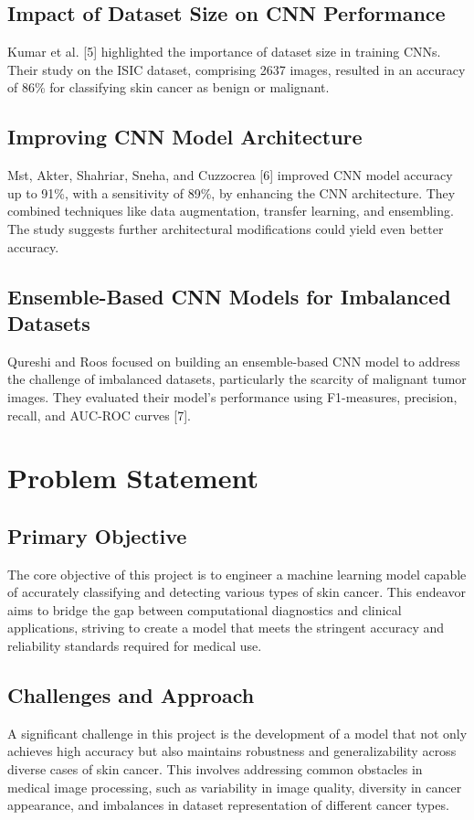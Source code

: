 \documentclass[conference]{IEEEtran}
\begin{document}
\subsection{Impact of Dataset Size on CNN Performance}
Kumar et al. [5] highlighted the importance of dataset size in training CNNs. Their study on the ISIC dataset, comprising 2637 images, resulted in an accuracy of 86\% for classifying skin cancer as benign or malignant.

\subsection{Improving CNN Model Architecture}
Mst, Akter, Shahriar, Sneha, and Cuzzocrea [6] improved CNN model accuracy up to 91\%, with a sensitivity of 89\%, by enhancing the CNN architecture. They combined techniques like data augmentation, transfer learning, and ensembling. The study suggests further architectural modifications could yield even better accuracy.

\subsection{Ensemble-Based CNN Models for Imbalanced Datasets}
Qureshi and Roos focused on building an ensemble-based CNN model to address the challenge of imbalanced datasets, particularly the scarcity of malignant tumor images. They evaluated their model's performance using F1-measures, precision, recall, and AUC-ROC curves [7].

\section{Problem Statement}

\subsection{Primary Objective}
The core objective of this project is to engineer a machine learning model capable of accurately classifying and detecting various types of skin cancer. This endeavor aims to bridge the gap between computational diagnostics and clinical applications, striving to create a model that meets the stringent accuracy and reliability standards required for medical use.

\subsection{Challenges and Approach}
A significant challenge in this project is the development of a model that not only achieves high accuracy but also maintains robustness and generalizability across diverse cases of skin cancer. This involves addressing common obstacles in medical image processing, such as variability in image quality, diversity in cancer appearance, and imbalances in dataset representation of different cancer types.
\end{document}
